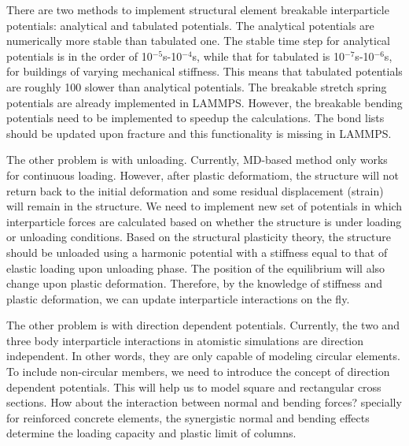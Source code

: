 \documentclass{proposalnsf}
\begin{document}
\begin{description}[font=$\bullet$~\normalfont\scshape\color{red!50!black}]

\item [Development One:] There are two methods to implement structural element breakable interparticle potentials: analytical and tabulated potentials. The analytical potentials are numerically more stable than tabulated one. The stable time step for analytical potentials is in the order of 10$^{-5}$s-10$^{-4}$s, while that for tabulated is 10$^{-7}$s-10$^{-6}$s, for  buildings of varying mechanical stiffness. This means that tabulated potentials are roughly 100 slower than analytical potentials. The breakable stretch spring potentials are already implemented in LAMMPS. However, the breakable bending potentials need to be implemented to speedup the calculations. The bond lists should be updated upon fracture and this functionality is missing in LAMMPS. 

\item [Development Two:] The other problem is with unloading. Currently, MD-based method only works for continuous loading. However, after plastic deformatiom, the structure will not return back to the initial deformation and some residual displacement (strain) will remain in the structure. We need to implement new set of potentials in which interparticle forces are calculated based on whether the structure is under loading or unloading conditions. Based on the structural plasticity theory, the structure should be unloaded using a harmonic potential with a stiffness equal to that of elastic loading upon unloading phase. The position of the equilibrium will also change upon plastic deformation. Therefore, by the knowledge of stiffness and plastic deformation, we can update interparticle interactions on the fly.

\item [Development Three:] The other problem is with direction dependent potentials. Currently, the two and three body interparticle interactions in atomistic simulations are direction independent. In other words, they are only capable of modeling circular elements. To include non-circular members, we need to introduce the concept of direction dependent potentials. This will help us to model square and rectangular cross sections. How about the interaction between normal and bending forces? specially for reinforced concrete elements, the synergistic normal and bending effects determine the loading capacity and plastic limit of columns.         


\end{description}
\end{document}
